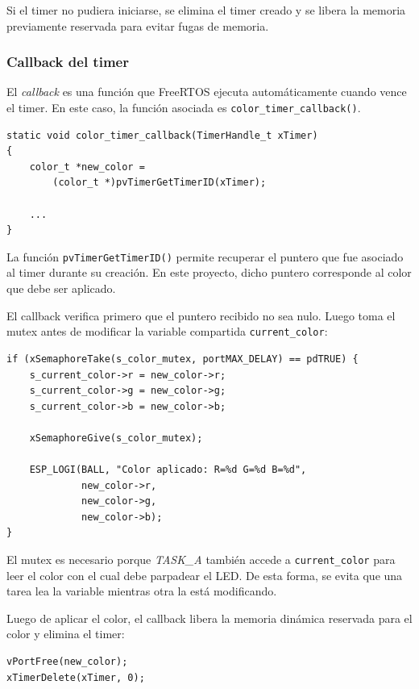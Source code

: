 \documentclass[12pt,letterpaper]{article}
\begin{document}
Si el timer no pudiera iniciarse, se elimina el timer creado y se libera la memoria previamente reservada para evitar fugas de memoria.

\subsubsection{Callback del timer}

El \textit{callback} es una función que FreeRTOS ejecuta automáticamente cuando vence el timer. En este caso, la función asociada es \texttt{color\_timer\_callback()}.

\begin{lstlisting}
static void color_timer_callback(TimerHandle_t xTimer)
{
    color_t *new_color =
        (color_t *)pvTimerGetTimerID(xTimer);

    ...
}
\end{lstlisting}

La función \texttt{pvTimerGetTimerID()} permite recuperar el puntero que fue asociado al timer durante su creación. En este proyecto, dicho puntero corresponde al color que debe ser aplicado.

El callback verifica primero que el puntero recibido no sea nulo. Luego toma el mutex antes de modificar la variable compartida \texttt{current\_color}:

\begin{lstlisting}
if (xSemaphoreTake(s_color_mutex, portMAX_DELAY) == pdTRUE) {
    s_current_color->r = new_color->r;
    s_current_color->g = new_color->g;
    s_current_color->b = new_color->b;

    xSemaphoreGive(s_color_mutex);

    ESP_LOGI(BALL, "Color aplicado: R=%d G=%d B=%d",
             new_color->r,
             new_color->g,
             new_color->b);
}
\end{lstlisting}

El mutex es necesario porque \textit{TASK\_A} también accede a \texttt{current\_color} para leer el color con el cual debe parpadear el LED. De esta forma, se evita que una tarea lea la variable mientras otra la está modificando.

Luego de aplicar el color, el callback libera la memoria dinámica reservada para el color y elimina el timer:

\begin{lstlisting}
vPortFree(new_color);
xTimerDelete(xTimer, 0);
\end{lstlisting}
\end{document}
